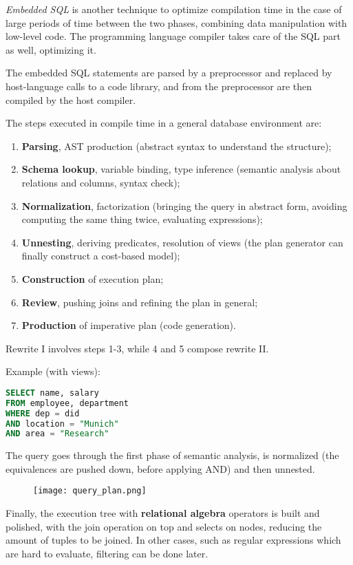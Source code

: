 \textit{Embedded SQL} is another technique to optimize compilation time in the case of large periods of time between the two phases, combining data manipulation with low-level code. The programming language compiler takes care of the SQL part as well, optimizing it.

The embedded SQL statements are parsed by a preprocessor and replaced by host-language calls to a code library, and from the preprocessor are then compiled by the host compiler.

The steps executed in compile time in a general database environment are:
\begin{enumerate}
	\item \textbf{Parsing}, AST production (abstract syntax to understand the structure);
	\item \textbf{Schema lookup}, variable binding, type inference (semantic analysis about relations and columns, syntax check);
	\item \textbf{Normalization}, factorization (bringing the query in abstract form, avoiding computing the same thing twice, evaluating expressions);
	\item \textbf{Unnesting}, deriving predicates, resolution of views (the plan generator can finally construct a cost-based model);
	\item \textbf{Construction} of execution plan;
	\item \textbf{Review}, pushing joins and refining the plan in general;
	\item \textbf{Production} of imperative plan (code generation).
\end{enumerate}
Rewrite I involves steps 1-3, while 4 and 5 compose rewrite II.

Example (with views):
\begin{lstlisting}[language=SQL]
SELECT name, salary
FROM employee, department
WHERE dep = did
AND location = "Munich"
AND area = "Research"
\end{lstlisting}
The query goes through the first phase of semantic analysis, is normalized (the equivalences are pushed down, before applying AND) and then unnested. 

\begin{figure}[h]
	\texttt{[image: query\_plan.png]}
	\centering
\end{figure}
Finally, the execution tree with \textbf{relational algebra} operators is built and polished, with the join operation on top and selects on nodes, reducing the amount of tuples to be joined. In other cases, such as regular expressions which are hard to evaluate, filtering can be done later.

